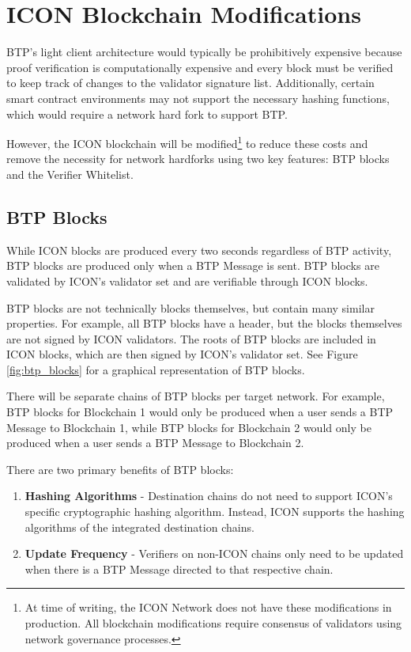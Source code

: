 \documentclass{article}
\newcounter{algo_steps}
\begin{document}
\section{ICON Blockchain Modifications}
\label{modifications}

BTP’s light client architecture would typically be prohibitively expensive because proof verification is computationally expensive and every block must be verified to keep track of changes to the validator signature list. Additionally, certain smart contract environments may not support the necessary hashing functions, which would require a network hard fork to support BTP.

However, the ICON blockchain will be modified\footnote{ At time of writing, the ICON Network does not have these modifications in production. All blockchain modifications require consensus of validators using network governance processes.} to reduce these costs and remove the necessity for network hardforks using two key features: BTP blocks and the Verifier Whitelist.

\subsection{BTP Blocks}
While ICON blocks are produced every two seconds regardless of BTP activity, BTP blocks are produced only when a BTP Message is sent. BTP blocks are validated by ICON’s validator set and are verifiable through ICON blocks.

BTP blocks are not technically blocks themselves, but contain many similar properties. For example, all BTP blocks have a header, but the blocks themselves are not signed by ICON validators. The roots of BTP blocks are included in ICON blocks, which are then signed by ICON’s validator set. See Figure \ref{fig:btp_blocks} for a graphical representation of BTP blocks.

There will be separate chains of BTP blocks per target network. For example, BTP blocks for Blockchain 1 would only be produced when a user sends a BTP Message to Blockchain 1, while BTP blocks for Blockchain 2 would only be produced when a user sends a BTP Message to Blockchain 2. 

There are two primary benefits of BTP blocks:\\

\begin{enumerate}
\item \textbf{Hashing Algorithms} - Destination chains do not need to support ICON’s specific cryptographic hashing algorithm. Instead, ICON supports the hashing algorithms of the integrated destination chains.
\item \textbf{Update Frequency} - Verifiers on non-ICON chains only need to be updated when there is a BTP Message directed to that respective chain.
\end{enumerate}
\end{document}
